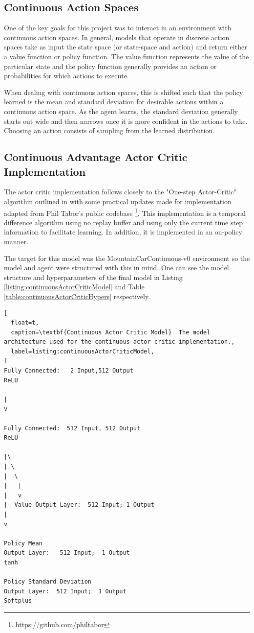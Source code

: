 \documentclass[conference]{IEEEtran}
\begin{document}
\subsection{Continuous Action Spaces}
One of the key goals for this project was to interact in an environment with continuous action spaces.
In general, models that operate in discrete action spaces take as input the state space (or state-space and action) and return either a value function or policy function.
The value function represents the value of the particular state and the policy function generally provides an action or probabilities for which actions to execute.

When dealing with continuous action spaces, this is shifted such that the policy learned is the mean and standard deviation for desirable actions within a continuous action space.
As the agent learns, the standard deviation generally starts out wide and then narrows once it is more confident in the actions to take.
Choosing an action consists of sampling from the learned distribution.

\subsection{Continuous Advantage Actor Critic Implementation}
The actor critic implementation follows closely to the "One-step Actor-Critic" algorithm outlined in \cite{ReinforcementLearningBook} with some practical updates made for implementation adapted from Phil Tabor's public codebase \footnote{https://github.com/philtabor}.
This implementation is a temporal difference algorithm using no replay buffer and using only the current time step information to facilitate learning.
In addition, it is implemented in an on-policy manner.

The target for this model was the MountainCarContinuous-v0 environment so the model and agent were structured with this in mind.
One can see the model structure and hyperparameters of the final model in Listing \ref{listing:continuousActorCriticModel} and Table \ref{table:continuousActorCriticHypers} respectively.


\begin{lstlisting}[
  float=t,
  caption=\textbf{Continuous Actor Critic Model}  The model architecture used for the continuous actor critic implementation.,
  label=listing:continuousActorCriticModel,
]
Fully Connected:   2 Input,512 Output
ReLU

|
v

Fully Connected:  512 Input, 512 Output  
ReLU

|\
| \
|  \
|   |
|   v
|  Value Output Layer:  512 Input; 1 Output
|
v

Policy Mean 
Output Layer:   512 Input;  1 Output
tanh

Policy Standard Deviation 
Output Layer:  512 Input;  1 Output
Softplus
\end{lstlisting}
\end{document}
